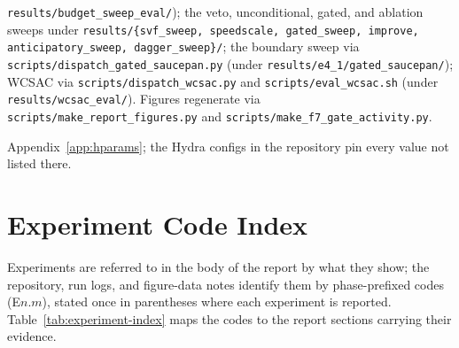 \documentclass[11pt,a4paper]{report}
\begin{document}
\begin{description}[leftmargin=2em,style=nextline]
  \texttt{results/budget\_sweep\_eval/}); the veto, unconditional,
  gated, and ablation sweeps under \texttt{results/\{svf\_sweep,
  speedscale, gated\_sweep, improve, anticipatory\_sweep,
  dagger\_sweep\}/}; the boundary sweep via
  \texttt{scripts/dispatch\_gated\_saucepan.py} (under
  \texttt{results/e4\_1/gated\_saucepan/}); WCSAC via
  \texttt{scripts/dispatch\_wcsac.py} and
  \texttt{scripts/eval\_wcsac.sh} (under
  \texttt{results/wcsac\_eval/}). Figures regenerate via
  \texttt{scripts/make\_report\_figures.py} and
  \texttt{scripts/make\_f7\_gate\_activity.py}.
\item[Hyperparameters] Appendix~\ref{app:hparams}; the Hydra configs
  in the repository pin every value not listed there.
\end{description}

\chapter{Experiment Code Index}
\label{app:exp-index}
\label{sec:setup:exp-index}

Experiments are referred to in the body of the report by what they
show; the repository, run logs, and figure-data notes identify them
by phase-prefixed codes (E$n.m$), stated once in parentheses where
each experiment is reported. Table~\ref{tab:experiment-index} maps
the codes to the report sections carrying their evidence.
\end{document}
